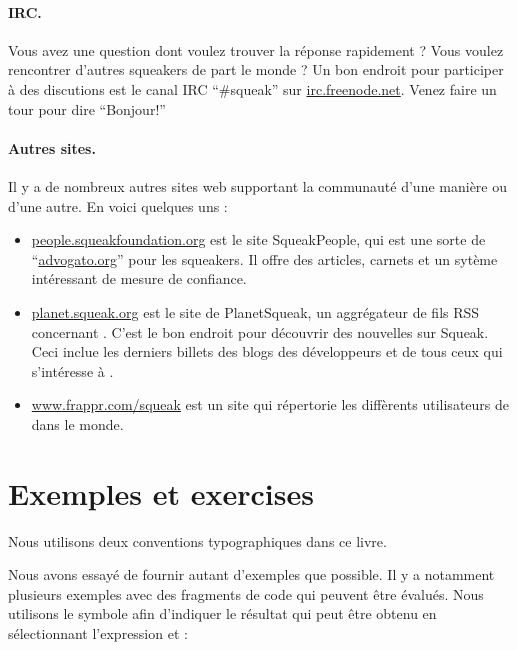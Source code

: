\documentclass[a4paper,10pt,twoside]{book}
\begin{document}
\paragraph{IRC.}
Vous avez une question dont voulez trouver la r\'eponse rapidement ? Vous voulez rencontrer d'autres squeakers de part le monde ? Un bon endroit pour participer \`a des discutions est le canal IRC ``\#squeak'' sur \url{irc.freenode.net}. Venez faire un tour pour dire ``Bonjour!''

\paragraph{Autres sites.} Il y a de nombreux autres sites web supportant la communaut\'e \sq d'une mani\`ere ou d'une autre. En voici quelques uns : 
\begin{itemize}
  \item \url{people.squeakfoundation.org} est le site SqueakPeople, qui est une sorte de  ``\url{advogato.org}'' pour les squeakers. Il offre des articles, carnets et un syt\`eme int\'eressant de mesure de confiance.

  \item \url{planet.squeak.org} est le site de PlanetSqueak, un aggr\'egateur de fils RSS concernant \sq. C'est le bon endroit pour d\'ecouvrir des nouvelles sur Squeak. Ceci inclue les derniers billets des blogs des d\'eveloppeurs et de tous ceux qui s'int\'eresse \`a \sq.

  \item \url{www.frappr.com/squeak} est un site qui r\'epertorie les diff\`erents utilisateurs de \sq dans le monde.

\end{itemize}


\section*{Exemples et exercises}

Nous utilisons deux conventions typographiques dans ce livre.

Nous avons essay\'e de fournir autant d'exemples que possible.
Il y a notamment plusieurs exemples avec des fragments de code qui peuvent \^etre \'evalu\'es. Nous utilisons le symbole \ct{-->} afin d'indiquer le r\'esultat qui peut \^etre obtenu en s\'electionnant l'expression et :
\end{document}

